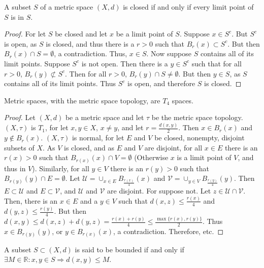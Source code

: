             \begin{theorem}
            A subset $S$ of a metric space $(X,d)$ is closed if and only if every limit point of $S$ is in $S$.
            \end{theorem}
            \begin{proof}
            For let $S$ be closed and let $x$ be a limit point of $S$. Suppose $x\in S^c$. But $S^c$ is open, as $S$ is closed, and thus there is a $r>0$ such that $B_{r}(x)\subset S^c$. But then $B_{r}(x)\cap S = \emptyset$, a contradiction. Thus, $x\in S$. Now suppose $S$ contains all of its limit points. Suppose $S^c$ is not open. Then there is a $y\in S^c$ such that for all $r>0$, $B_{r}(y)\not \subset S^c$. Then for all $r>0$, $B_{r}(y)\cap S \ne \emptyset$. But then $y\in S$, as $S$ contains all of its limit points. Thus $S^c$ is open, and therefore $S$ is closed.
            \end{proof}
            \begin{theorem}
            Metric spaces, with the metric space topology, are $T_4$ spaces.
            \end{theorem}
            \begin{proof}
            Let $(X,d)$ be a metric space and let $\tau$ be the metric space topology. $(X,\tau)$ is $T_1$, for let $x,y\in X$, $x\ne y$, and let $r= \frac{d(x,y)}{2}$. Then $x\in B_{r}(x)$ and $y\notin B_{r}(x)$. $(X,\tau)$ is normal, for let $E$ and $V$ be closed, nonempty, disjoint subsets of $X$. As $V$ is closed, and as $E$ and $V$ are disjoint, for all $x\in E$ there is an $r(x)>0$ such that $B_{r(x)}(x)\cap V = \emptyset$ (Otherwise $x$ is a limit point of $V$, and thus in $V$). Similarly, for all $y\in V$ there is an $r(y)>0$ such that $B_{r(y)}(y)\cap E = \emptyset$. Let $\mathcal{U} = \cup_{x\in E}B_{\frac{r(x)}{4}}(x)$ and $\mathcal{V} = \cup_{y\in V}B_{\frac{r(y)}{4}}(y)$. Then $E\subset \mathcal{U}$ and $E\subset \mathcal{V}$, and $\mathcal{U}$ and $\mathcal{V}$ are disjoint. For suppose not. Let $z\in \mathcal{U}\cap \mathcal{V}$. Then, there is an $x\in E$ and a $y\in V$ such that $d(x,z)\leq \frac{r(x)}{4}$ and $d(y,z)\leq \frac{r(y)}{4}$. But then $d(x,y) \leq d(x,z)+d(y,z) = \frac{r(x)+r(y)}{4} \leq \frac{\max\{r(x),r(y)\}}{2}$. Thus $x\in B_{r(y)}(y)$, or $y\in B_{r(x)}(x)$, a contradiction. Therefore, etc.
            \end{proof}
            \begin{definition}
            A subset $S\subset (X,d)$ is said to be bounded if and only if $\exists M\in \mathbb{R}:x,y\in S\Rightarrow d(x,y)\leq M$.
            \end{definition}

